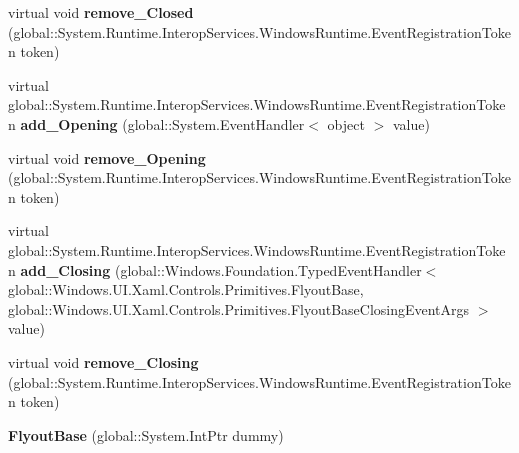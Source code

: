 \begin{DoxyCompactItemize}
\mbox{\label{class_windows_1_1_u_i_1_1_xaml_1_1_controls_1_1_primitives_1_1_flyout_base_a910f4919b18377849ddf436963142092}} 
virtual void {\bfseries remove\+\_\+\+Closed} (global\+::\+System.\+Runtime.\+Interop\+Services.\+Windows\+Runtime.\+Event\+Registration\+Token token)
\item 
\mbox{\label{class_windows_1_1_u_i_1_1_xaml_1_1_controls_1_1_primitives_1_1_flyout_base_a8dbfb4d3df5e017a006229b035558c61}} 
virtual global\+::\+System.\+Runtime.\+Interop\+Services.\+Windows\+Runtime.\+Event\+Registration\+Token {\bfseries add\+\_\+\+Opening} (global\+::\+System.\+Event\+Handler$<$ object $>$ value)
\item 
\mbox{\label{class_windows_1_1_u_i_1_1_xaml_1_1_controls_1_1_primitives_1_1_flyout_base_a24e892a50720e9b950a86332383a641c}} 
virtual void {\bfseries remove\+\_\+\+Opening} (global\+::\+System.\+Runtime.\+Interop\+Services.\+Windows\+Runtime.\+Event\+Registration\+Token token)
\item 
\mbox{\label{class_windows_1_1_u_i_1_1_xaml_1_1_controls_1_1_primitives_1_1_flyout_base_a048b76cc08a938c4371b9bc74777d73a}} 
virtual global\+::\+System.\+Runtime.\+Interop\+Services.\+Windows\+Runtime.\+Event\+Registration\+Token {\bfseries add\+\_\+\+Closing} (global\+::\+Windows.\+Foundation.\+Typed\+Event\+Handler$<$ global\+::\+Windows.\+U\+I.\+Xaml.\+Controls.\+Primitives.\+Flyout\+Base, global\+::\+Windows.\+U\+I.\+Xaml.\+Controls.\+Primitives.\+Flyout\+Base\+Closing\+Event\+Args $>$ value)
\item 
\mbox{\label{class_windows_1_1_u_i_1_1_xaml_1_1_controls_1_1_primitives_1_1_flyout_base_a3d2a27eaf9daaa9e54e906ae772bc53b}} 
virtual void {\bfseries remove\+\_\+\+Closing} (global\+::\+System.\+Runtime.\+Interop\+Services.\+Windows\+Runtime.\+Event\+Registration\+Token token)
\item 
\mbox{\label{class_windows_1_1_u_i_1_1_xaml_1_1_controls_1_1_primitives_1_1_flyout_base_aa5806d40967d26c2011e0427640dd885}} 
{\bfseries Flyout\+Base} (global\+::\+System.\+Int\+Ptr dummy)
\end{DoxyCompactItemize}
